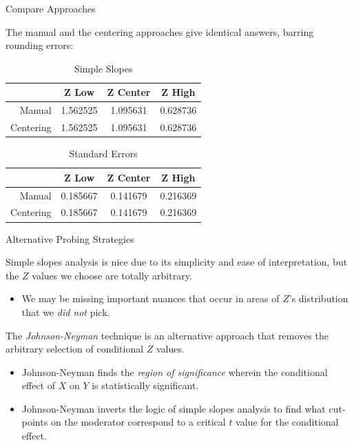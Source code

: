 \documentclass{beamer}\usepackage[]{graphicx}\usepackage[]{color}
\begin{document}

\captionsetup{labelformat=empty}
\begin{frame}{Compare Approaches}
  
  The manual and the centering approaches give identical answers, barring 
  rounding errors: 
  \vb
\begin{table}[ht]
\centering
\begin{tabular}{rccc}
  \toprule
 & Z Low & Z Center & Z High \\ 
  \midrule
Manual & 1.562525 & 1.095631 & 0.628736 \\ 
  Centering & 1.562525 & 1.095631 & 0.628736 \\ 
   \bottomrule
\end{tabular}
\caption{Simple Slopes} 
\end{table}



\begin{table}[ht]
\centering
\begin{tabular}{rccc}
  \toprule
 & Z Low & Z Center & Z High \\ 
  \midrule
Manual & 0.185667 & 0.141679 & 0.216369 \\ 
  Centering & 0.185667 & 0.141679 & 0.216369 \\ 
   \bottomrule
\end{tabular}
\caption{Standard Errors} 
\end{table}


\end{frame}
\captionsetup{labelformat=default}

\watermarkon %

\begin{frame}{Alternative Probing Strategies}
  
  Simple slopes analysis is nice due to its simplicity and ease of
  interpretation, but the $Z$ values we choose are totally arbitrary.
  \vc
  \begin{itemize}
  \item We may be missing important nuances that occur in areas of $Z$'s 
    distribution that we \emph{did not} pick.
  \end{itemize}
  \vb
  \pause
  The \emph{Johnson-Neyman} technique is an alternative approach that removes 
  the arbitrary selection of conditional $Z$ values.
  \vc
  \begin{itemize}
  \item Johnson-Neyman finds the \emph{region of significance} wherein the 
    conditional effect of $X$ on $Y$ is statistically significant.
    \vc
  \item Johnson-Neyman inverts the logic of simple slopes analysis to find what 
    cut-points on the moderator correspond to a critical $t$ value for the 
    conditional effect.
  \end{itemize}
  
\end{frame}
\end{document}
